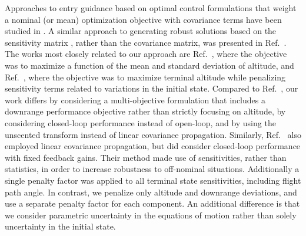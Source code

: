 \documentclass[journal ]{new-aiaa}
\begin{document}

Approaches to entry guidance based on optimal control formulations that weight a nominal (or mean) optimization objective with covariance terms have been studied in \cite{AltitudeUnderUncertainty, EntryOUUThesis1, EntryOUUThesis2, EntryOUU}. A similar approach to generating robust solutions based on the sensitivity matrix \cite{Desensitized}, rather than the covariance matrix, was presented in Ref.~\cite{MarsEntryDesensitized}. 
The works most closely related to our approach are Ref.~\cite{AltitudeUnderUncertainty}, where the objective was to maximize a function of the mean and standard deviation of altitude, and Ref.~\cite{MarsEntryDesensitized}, where the objective was to maximize terminal altitude while penalizing sensitivity terms related to variations in the initial state. Compared to Ref.~\cite{AltitudeUnderUncertainty}, our work differs by considering a multi-objective formulation that includes a downrange performance objective rather than strictly focusing on altitude, by considering closed-loop performance instead of open-loop, and by using the unscented transform instead of linear covariance propagation. Similarly, Ref.~\cite{MarsEntryDesensitized} also employed linear covariance propagation, but did consider closed-loop performance with fixed feedback gains. Their method made use of sensitivities, rather than statistics, in order to increase robustness to off-nominal situations. Additionally a single penalty factor was applied to all terminal state sensitivities, including flight path angle. In contrast, we penalize only altitude and downrange deviations, and use a separate penalty factor for each component. An additional difference is that we consider parametric uncertainty in the equations of motion rather than solely uncertainty in the initial state. 

\end{document}
